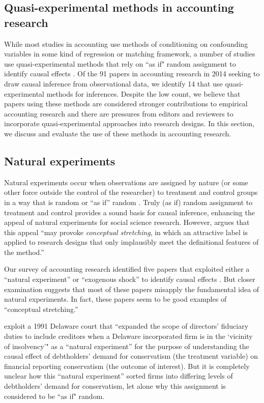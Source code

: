 \documentclass[11pt,reqno,titlepage]{amsart}
\begin{document}
\begin{doublespace}
\section{Quasi-experimental methods in accounting research} \label{sec:quasi}
While most studies in accounting use methods of conditioning on confounding variables in some kind of regression or matching framework, a number of studies use quasi-experimental methods that rely on ``as if" random assignment to identify causal effects \citep{Dunning:2012tt}.
Of the 91 papers in accounting research in 2014 seeking to draw causal inference from observational data, we identify 14 that use quasi-experimental methods for inferences. Despite the low count, we believe that papers using these methods are considered stronger contributions to empirical accounting research and there are pressures from editors and reviewers to incorporate quasi-experimental approaches into research designs.
In this section, we discuss and evaluate the use of these methods in accounting research.

\subsection{Natural experiments}
Natural experiments occur when observations are assigned by nature (or some other force outside the control of the researcher) to treatment and control groups in a way that is random or ``as if'' random \citep{Dunning:2012tt}. 
Truly (as if) random assignment to treatment and control provides a sound basis for causal inference, enhancing the appeal of natural experiments for social science research.
However, \citet[\,p.3, emphasis added]{Dunning:2012tt} argues that this appeal ``may provoke \emph{conceptual stretching}, in which an attractive label is applied to research designs that only implausibly meet the definitional features of the method.'' 

Our survey of accounting research identified five papers that exploited either a ``natural experiment'' or ``exogenous shock'' to identify causal effects \citep{Lo:2013jk,Aier:2014ii,Kirk:2014gx,Houston:2014hv,Hail:2014fq}.
But closer examination suggests that most of these papers misapply the fundamental idea of natural experiments. 
In fact, these papers seem to be good examples of ``conceptual stretching.''

\cite{Aier:2014ii} exploit a 1991 Delaware court that ``expanded the scope of directors' fiduciary duties to include creditors when a Delaware incorporated firm is in the `vicinity of insolvency'" as a ``natural experiment'' for the purpose of understanding the causal effect of debtholders' demand for conservatism (the treatment variable) on financial reporting conservatism (the outcome of interest).
But it is completely unclear how this ``natural experiment'' sorted firms into differing levels of debtholders' demand for conservatism, let alone why this assignment is considered to be ``as if" random.


\end{doublespace}
\end{document}
